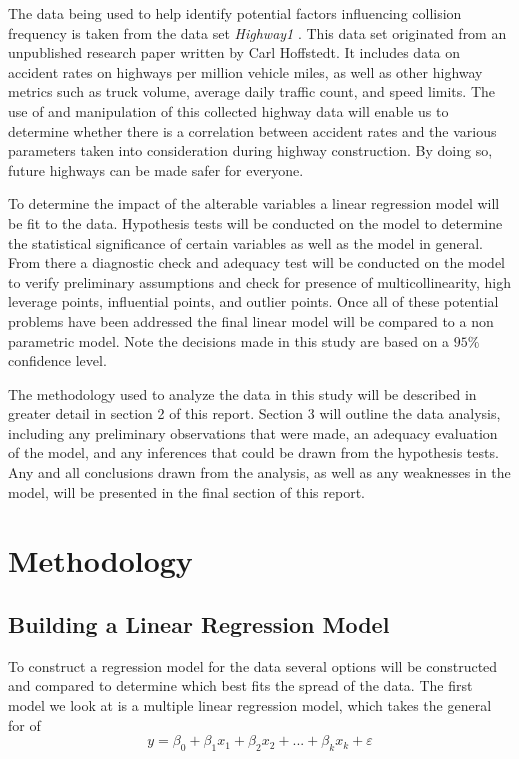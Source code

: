 \documentclass[12pt]{report}
\begin{document}
The data being used to help identify potential factors influencing collision frequency is taken from the data set \textit{Highway1} \cite{Data}. This data set originated from an unpublished research paper written by Carl Hoffstedt. It includes data on accident rates on highways per million vehicle miles, as well as other highway metrics such as truck volume, average daily traffic count, and speed limits. The use of and manipulation of this collected highway data will enable us to determine whether there is a correlation between accident rates and the various parameters taken into consideration during highway construction. By doing so, future highways can be made safer for everyone. 

To determine the impact of the alterable variables a linear regression model will be fit to the data. Hypothesis tests will be conducted on the model to determine the statistical significance of certain variables as well as the model in general. From there a diagnostic check and adequacy test will be conducted on the model to verify preliminary assumptions and check for presence of multicollinearity, high leverage points, influential points, and outlier points. Once all of these potential problems have been addressed the final linear model will be compared to a non parametric model. Note the decisions made in this study are based on a $95\%$ confidence level.

The methodology used to analyze the data in this study will be described in greater detail in section 2 of this report. Section 3 will outline the data analysis, including any preliminary observations that were made, an adequacy evaluation of the model, and any inferences that could be drawn from the hypothesis tests. Any and all conclusions drawn from the analysis, as well as any weaknesses in the model, will be presented in the final section of this report.

\chapter{Methodology}
\section{Building a Linear Regression Model}

To construct a regression model for the data several options will be constructed and compared to determine which best fits the spread of the data. The first model we look at is a multiple linear regression model, which takes the general for of 
\begin{equation}
    y = \beta_{0} + \beta_{1}{x_{1}} + \beta_{2}{x_{2}} + ... + \beta_{k}{x_{k}} + \varepsilon
\end{equation}
\end{document}
